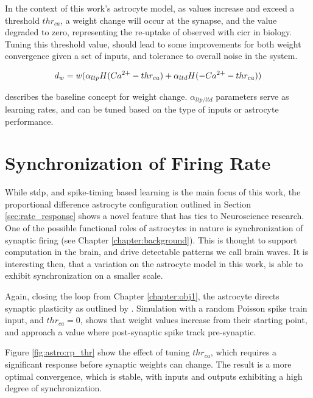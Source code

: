 In the context of this work's astrocyte model, as \ca values increase and exceed
a threshold $thr_{ca}$, a weight change will occur at the synapse, and the \ca
value degraded to zero, representing the re-uptake of \ca observed with \gls{cicr} in
biology. Tuning this threshold value, should lead to some improvements for both
weight convergence given a set of inputs, and tolerance to overall noise in the
system.

\begin{align}
  d_w = w (\alpha_{ltp} H(Ca^{2+} - thr_{ca}) + \alpha_{ltd} H(-Ca^{2+} - thr_{ca}))  \label{eq:dw-thr}
\end{align}

 describes the baseline concept for weight
change. $\alpha_{ltp/ltd}$ parameters serve as learning rates, and can be tuned
based on the type of inputs or astrocyte performance.


\section{Synchronization of Firing Rate}
While \gls{stdp}, and spike-timing based learning is the main focus of this work, the
proportional difference astrocyte configuration outlined in Section
\ref{sec:rate_response} shows a novel feature that has ties to Neuroscience
research. One of the possible functional roles of astrocytes in nature is
synchronization of synaptic firing (see Chapter \ref{chapter:background}). This
is thought to support computation in the brain, and drive detectable patterns we
call brain waves. It is interesting then, that a variation on the astrocyte
model in this work, is able to exhibit synchronization on a smaller scale.

Again, closing the loop from Chapter \ref{chapter:obj1}, the astrocyte directs
synaptic plasticity as outlined by . Simulation with a
random Poisson spike train input, and $thr_{ca}=0$, shows that weight values
increase from their starting point, and approach a value where post-synaptic
spike track pre-synaptic.



Figure \ref{fig:astro:rp_thr} show the effect of tuning $thr_{ca}$, which
requires a significant \ca response before synaptic weights can change. The
result is a more optimal convergence, which is stable, with inputs and outputs
exhibiting a high degree of synchronization.

